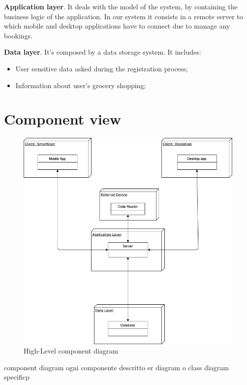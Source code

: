 \textbf{Application layer}. It deals with the model of the system, by containing the business logic of the application. In our system it consists in a remote server to which mobile and desktop applications have to connect due to manage any bookings.

\textbf{Data layer}. It's composed by a data storage system. It includes: 

\begin{itemize}
\item User sensitive data asked during the registration process;
\item Information about user's grocery shopping;
\end{itemize}



\section{Component view}


\begin{figure}[H]
  \caption{High-Level component diagram}
  \label{highlevel}
  \centering
  \includegraphics[scale=0.25]{diagrams/h_level.png}

\end{figure}
component diagram ogni componente descritto
er diagram o class diagram specificp


